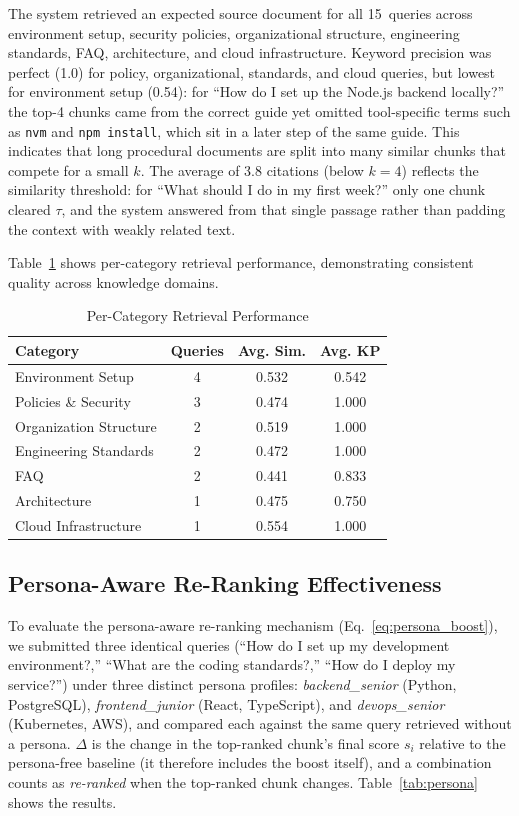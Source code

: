 \documentclass[conference]{IEEEtran}
\begin{document}
The system retrieved an expected source document for all 15~queries across environment setup, security policies, organizational structure, engineering standards, FAQ, architecture, and cloud infrastructure. Keyword precision was perfect (1.0) for policy, organizational, standards, and cloud queries, but lowest for environment setup (0.54): for ``How do I set up the Node.js backend locally?'' the top-4 chunks came from the correct guide yet omitted tool-specific terms such as \texttt{nvm} and \texttt{npm install}, which sit in a later step of the same guide. This indicates that long procedural documents are split into many similar chunks that compete for a small $k$. The average of 3.8 citations (below $k=4$) reflects the similarity threshold: for ``What should I do in my first week?'' only one chunk cleared $\tau$, and the system answered from that single passage rather than padding the context with weakly related text.

Table~\ref{tab:per_category} shows per-category retrieval performance, demonstrating consistent quality across knowledge domains.

\begin{table}[htbp]
\centering
\caption{Per-Category Retrieval Performance}
\label{tab:per_category}
\begin{tabular}{l c c c}
\toprule
\textbf{Category} & \textbf{Queries} & \textbf{Avg. Sim.} & \textbf{Avg. KP} \\
\midrule
Environment Setup & 4 & 0.532 & 0.542 \\
Policies \& Security & 3 & 0.474 & 1.000 \\
Organization Structure & 2 & 0.519 & 1.000 \\
Engineering Standards & 2 & 0.472 & 1.000 \\
FAQ & 2 & 0.441 & 0.833 \\
Architecture & 1 & 0.475 & 0.750 \\
Cloud Infrastructure & 1 & 0.554 & 1.000 \\
\bottomrule
\end{tabular}
\end{table}

\subsection{Persona-Aware Re-Ranking Effectiveness}

To evaluate the persona-aware re-ranking mechanism (Eq.~\ref{eq:persona_boost}), we submitted three identical queries (``How do I set up my development environment?,'' ``What are the coding standards?,'' ``How do I deploy my service?'') under three distinct persona profiles: \textit{backend\_\allowbreak senior} (Python, PostgreSQL), \textit{frontend\_\allowbreak junior} (React, TypeScript), and \textit{devops\_\allowbreak senior} (Kubernetes, AWS), and compared each against the same query retrieved without a persona. $\Delta$ is the change in the top-ranked chunk's final score $s_i$ relative to the persona-free baseline (it therefore includes the boost itself), and a combination counts as \emph{re-ranked} when the top-ranked chunk changes. Table~\ref{tab:persona} shows the results.
\end{document}

